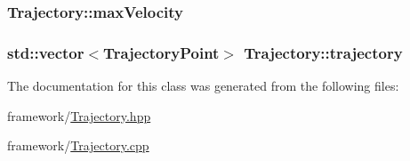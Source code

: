 \hypertarget{classTrajectory_a7101fccd21bccbf6ff66ae855fc6fb04}{
\subsubsection[{max\-Velocity}]{ Trajectory\-::max\-Velocity\hspace{0.3cm}{\ttfamily [private]}}}\label{classTrajectory_a7101fccd21bccbf6ff66ae855fc6fb04}
\hypertarget{classTrajectory_a159e6800353ba91aa66f304de8fa177c}{
\subsubsection[{trajectory}]{\setlength{\rightskip}{0pt plus 5cm}std\-::vector$<${\bf Trajectory\-Point}$>$ Trajectory\-::trajectory\hspace{0.3cm}{\ttfamily [private]}}}\label{classTrajectory_a159e6800353ba91aa66f304de8fa177c}


The documentation for this class was generated from the following files\-:\begin{DoxyCompactItemize}
\item 
framework/\hyperlink{Trajectory_8hpp}{Trajectory.\-hpp}\item 
framework/\hyperlink{Trajectory_8cpp}{Trajectory.\-cpp}\end{DoxyCompactItemize}
